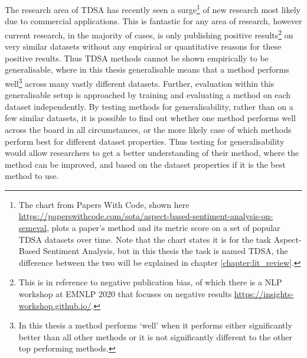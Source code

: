 The research area of TDSA has recently seen a surge\footnote{The chart from Papers With Code, shown here \url{https://paperswithcode.com/sota/aspect-based-sentiment-analysis-on-semeval}, plots a paper's method and its metric score on a set of popular TDSA datasets over time. Note that the chart states it is for the task Aspect-Based Sentiment Analysis, but in this thesis the task is named TDSA, the difference between the two will be explained in chapter \ref{chapter:lit_review}.} of new research most likely due to commercial applications. This is fantastic for any area of research, however current research, in the majority of cases, is only publishing positive results\footnote{This is in reference to negative publication bias, of which there is a NLP workshop at EMNLP 2020 that focuses on negative results \url{https://insights-workshop.github.io/}.} on very similar datasets without any empirical or quantitative reasons for these positive results. Thus TDSA methods cannot be shown empirically to be generalisable, where in this thesis generalisable means that a method performs well\footnote{In this thesis a method performs `well' when it performs either significantly better than all other methods or it is not significantly different to the other top performing methods.} across many vastly different datasets. Further, evaluation within this generalisable setup is approached by training and evaluating a method on each dataset independently. By testing methods for generalisability, rather than on a few similar datasets, it is possible to find out whether one method performs well across the board in all circumstances, or the more likely case of which methods perform best for different dataset properties. Thus testing for generalisability would allow researchers to get a better understanding of their method, where the method can be improved, and based on the dataset properties if it is the best method to use.


